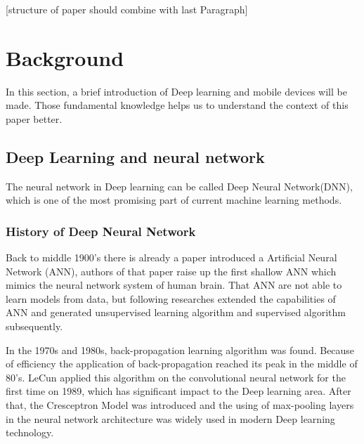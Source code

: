 \documentclass[article]{aaltoseries}
\begin{document}
[structure of paper should combine with last Paragraph]









\section{Background}

In this section, a brief introduction of Deep learning and mobile devices will be made. Those fundamental 
knowledge helps us to understand the context of this paper better.




\subsection{Deep Learning and neural network}

The neural network in Deep learning can be called Deep Neural Network(DNN), which is one of the most promising 
part of current machine learning methods. 

\subsubsection{History of Deep Neural Network}

Back to middle 1900's there is already a paper introduced a Artificial Neural Network (ANN)\cite{Warren1943}, authors
of that paper raise up the first shallow ANN which mimics the neural network system of human brain. That ANN are not
able to learn models from data, but following researches extended the capabilities of ANN and generated unsupervised 
learning algorithm and supervised algorithm subsequently.

In the 1970s and 1980s, back-propagation learning algorithm was found. Because of efficiency the application of back-propagation
reached its peak in the middle of 80's. LeCun applied this algorithm on the convolutional neural network 
for the first time on 1989, which has significant impact to the Deep learning area. After that, the Cresceptron Model was introduced
and the using of max-pooling layers in the neural network architecture was widely used in modern Deep learning technology.
\end{document}
